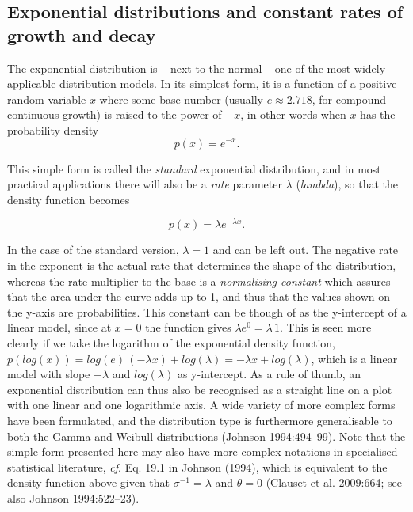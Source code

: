 \documentclass[
  12pt,
]{book}
\begin{document}
\hypertarget{exponential-distributions-and-constant-rates-of-growth-and-decay}{%
\subsection{Exponential distributions and constant rates of growth and decay}\label{exponential-distributions-and-constant-rates-of-growth-and-decay}}

The exponential distribution is -- next to the normal -- one of the most widely applicable distribution models. In its simplest form, it is a function of a positive random variable \(x\) where some base number (usually \(e \approx 2.718\), for compound continuous growth) is raised to the power of \(-x\), in other words when \(x\) has the probability density \[p(x) = e^{-x}.\]

This simple form is called the \emph{standard} exponential distribution, and in most practical applications there will also be a \emph{rate} parameter \(\lambda\) (\emph{lambda}), so that the density function becomes

\begin{equation} p(x) = \lambda e^{-\lambda x}.
\label{eq:exponential}
\end{equation}

In the case of the standard version, \(\lambda = 1\) and can be left out. The negative rate in the exponent is the actual rate that determines the shape of the distribution, whereas the rate multiplier to the base is a \emph{normalising constant} which assures that the area under the curve adds up to 1, and thus that the values shown on the y-axis are probabilities. This constant can be though of as the y-intercept of a linear model, since at \(x = 0\) the function gives \(\lambda e^0 = \lambda\,1\). This is seen more clearly if we take the logarithm of the exponential density function, \(p(log(x)) = log(e)\,(-\lambda x) + log(\lambda) = -\lambda x+log(\lambda)\), which is a linear model with slope \(-\lambda\) and \(log(\lambda)\) as y-intercept. As a rule of thumb, an exponential distribution can thus also be recognised as a straight line on a plot with one linear and one logarithmic axis. A wide variety of more complex forms have been formulated, and the distribution type is furthermore generalisable to both the Gamma and Weibull distributions (Johnson 1994:494--99). Note that the simple form presented here may also have more complex notations in specialised statistical literature, \emph{cf}. Eq. 19.1 in Johnson (1994), which is equivalent to the density function above given that \(\sigma^{-1} = \lambda\) and \(\theta = 0\) (Clauset et al. 2009:664; see also Johnson 1994:522--23).
\end{document}

